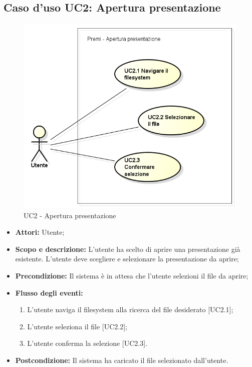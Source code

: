\subsection{Caso d'uso UC2: Apertura presentazione}
\begin{figure}[h] 
	\centering 
	\includegraphics[scale=0.45] {img/UC2.png} 
	\caption{UC2 - Apertura presentazione} 
\end{figure}

\begin{itemize}
	\item \textbf{Attori:} Utente;
	\item \textbf{Scopo e descrizione:} L'utente ha scelto di aprire una presentazione già esistente. L'utente deve scegliere e selezionare la presentazione da aprire;
	\item \textbf{Precondizione:} Il sistema è in attesa che l'utente selezioni il file da aprire;
	\item \textbf{Flusso degli eventi:}
	\begin{enumerate}
		\item L'utente naviga il filesystem alla ricerca del file desiderato [UC2.1];
		\item L'utente seleziona il file [UC2.2];
		\item L'utente conferma la selezione [UC2.3].
	\end{enumerate}
	\item \textbf{Postcondizione:} Il sistema ha caricato il file selezionato dall'utente.
\end{itemize}


